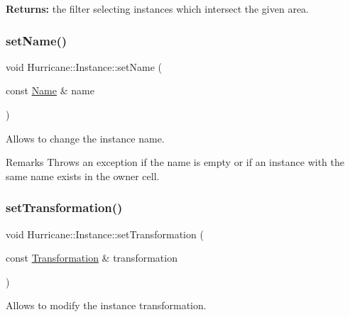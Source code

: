{\bfseries Returns\+:} the filter selecting instances which intersect the given area. \mbox{\label{classHurricane_1_1Instance_ae3b67792d1659f1a20c6533b8843b905}} 
\subsubsection{\texorpdfstring{set\+Name()}{setName()}}
{\footnotesize\ttfamily void Hurricane\+::\+Instance\+::set\+Name (\begin{DoxyParamCaption}\item[{const \mbox{\hyperlink{classHurricane_1_1Name}{Name}} \&}]{name }\end{DoxyParamCaption})}

Allows to change the instance name.

\begin{DoxyRemark}{Remarks}
Throws an exception if the name is empty or if an instance with the same name exists in the owner cell. 
\end{DoxyRemark}
\mbox{\label{classHurricane_1_1Instance_a8890d2e1b2ba2542997454297e63512f}} 
\subsubsection{\texorpdfstring{set\+Transformation()}{setTransformation()}}
{\footnotesize\ttfamily void Hurricane\+::\+Instance\+::set\+Transformation (\begin{DoxyParamCaption}\item[{const \mbox{\hyperlink{classHurricane_1_1Transformation}{Transformation}} \&}]{transformation }\end{DoxyParamCaption})}

Allows to modify the instance transformation. \mbox{\label{classHurricane_1_1Instance_a9f626fd058c21ffc2ed5bfee8d29a853}} 
